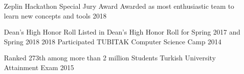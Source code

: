 

\cvsubsection{ }

\begin{cvhonors}
  \cvhonor
    {Zeplin Hackathon Special Jury Award} %
    {Awarded as most enthusiastic team to learn new concepts and tools} %
    {} %
    {2018} %


  \cvhonor
    {Dean’s High Honor Roll } %
    {Listed in Dean's High Honor Roll for Spring 2017 and Spring 2018} %
    {} %
    {2018} %
  \cvhonor
    {Participated} %
    {TUBITAK Computer Science Camp} %
    {} %
    {2014} %

  \cvhonor
    {Ranked 273th among more than 2 million Students} %
    {Turkish University Attainment Exam} %
    {} %
    {2015} %
\begin{comment}
  \cvhonor
    {Ranked 1th among more than 1 million Students} %
    {Turkish High School Attainment Exam} %
    {} %
    {2011} %



  \cvhonor
    {Ranked in top 50} %
    {TUBITAK National Middle School Mathematic Olympiads} %
    {} %
    {2014} %


  \cvhonor
    {Vehbi Koc Scholar} %
    {Awarded for SPA over 3.50 /4.00 in Fall 2016, Spring 2017 and Fall 2017} %
    {} %
    {2017} %
\end{comment}
\end{cvhonors}



